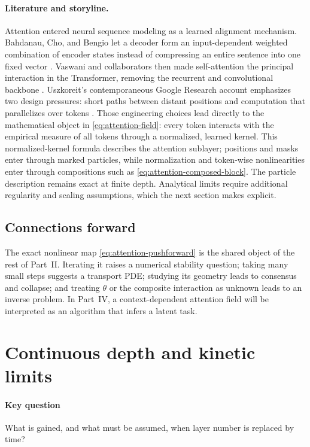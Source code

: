 \documentclass[11pt]{amsart}
\numberwithin{equation}{section}
\theoremstyle{plain}
\begin{document}
\paragraph{\textbf{Literature and storyline.}}
Attention entered neural sequence modeling as a learned alignment mechanism.
Bahdanau, Cho, and Bengio let a decoder form an input-dependent weighted
combination of encoder states instead of compressing an entire sentence into
one fixed vector \cite{BahdanauEtAl2015}.  Vaswani and collaborators then made
self-attention the principal interaction in the Transformer, removing the
recurrent and convolutional backbone \cite{VaswaniEtAl2017}.  Uszkoreit's
contemporaneous Google Research account emphasizes two design pressures:
short paths between distant positions and computation that parallelizes over
tokens \cite{UszkoreitGoogle2017}.  Those engineering choices lead directly to
the mathematical object in \eqref{eq:attention-field}: every token interacts
with the empirical measure of all tokens through a normalized, learned
kernel.  This normalized-kernel formula describes the attention sublayer;
positions and masks enter through marked particles, while normalization and
token-wise nonlinearities enter through compositions such as
\eqref{eq:attention-composed-block}.  The particle description remains exact
at finite depth.  Analytical limits require additional regularity and scaling
assumptions, which the next section makes explicit.

\subsection{Connections forward}
The exact nonlinear map \eqref{eq:attention-pushforward} is the shared object of
the rest of Part~II.  Iterating it raises a numerical stability question;
taking many small steps suggests a transport PDE; studying its geometry leads
to consensus and collapse; and treating $\theta$ or the composite interaction
as unknown leads to an inverse problem.  In Part~IV, a context-dependent
attention field will be interpreted as an algorithm that infers a latent task.

\section{Continuous depth and kinetic limits}
\label{sec:continuous-depth}
\paragraph{\textbf{Key question}}
What is gained, and what must be assumed, when layer number is replaced by time?
\end{document}
